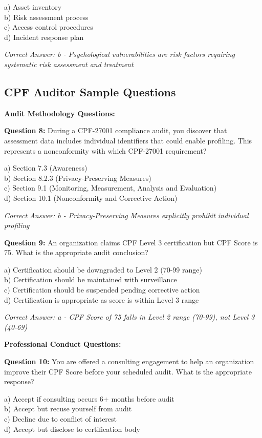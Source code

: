 \documentclass[11pt,a4paper]{article}
\begin{document}
a) Asset inventory\\
b) Risk assessment process\\
c) Access control procedures\\
d) Incident response plan

\textit{Correct Answer: b - Psychological vulnerabilities are risk factors requiring systematic risk assessment and treatment}

\subsection{CPF Auditor Sample Questions}

\textbf{Audit Methodology Questions:}

\textbf{Question 8:} During a CPF-27001 compliance audit, you discover that assessment data includes individual identifiers that could enable profiling. This represents a nonconformity with which CPF-27001 requirement?

a) Section 7.3 (Awareness)\\
b) Section 8.2.3 (Privacy-Preserving Measures)\\
c) Section 9.1 (Monitoring, Measurement, Analysis and Evaluation)\\
d) Section 10.1 (Nonconformity and Corrective Action)

\textit{Correct Answer: b - Privacy-Preserving Measures explicitly prohibit individual profiling}

\textbf{Question 9:} An organization claims CPF Level 3 certification but CPF Score is 75. What is the appropriate audit conclusion?

a) Certification should be downgraded to Level 2 (70-99 range)\\
b) Certification should be maintained with surveillance\\
c) Certification should be suspended pending corrective action\\
d) Certification is appropriate as score is within Level 3 range

\textit{Correct Answer: a - CPF Score of 75 falls in Level 2 range (70-99), not Level 3 (40-69)}

\textbf{Professional Conduct Questions:}

\textbf{Question 10:} You are offered a consulting engagement to help an organization improve their CPF Score before your scheduled audit. What is the appropriate response?

a) Accept if consulting occurs 6+ months before audit\\
b) Accept but recuse yourself from audit\\
c) Decline due to conflict of interest\\
d) Accept but disclose to certification body
\end{document}
